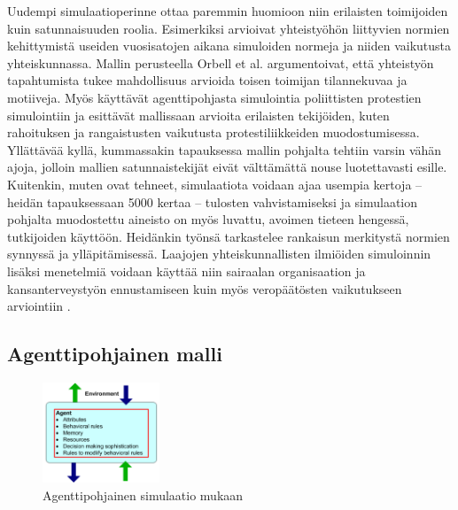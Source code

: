 \documentclass[finnish,gradu,twoside,12pt]{tktltiki}
\begin{document}
Uudempi simulaatioperinne ottaa paremmin huomioon niin erilaisten toimijoiden kuin satunnaisuuden roolia. Esimerkiksi \citet{orbell2004machiavellian} arvioivat yhteistyöhön liittyvien normien kehittymistä useiden vuosisatojen aikana simuloiden normeja ja niiden vaikutusta yhteiskunnassa. Mallin perusteella Orbell et al. argumentoivat, että yhteistyön tapahtumista tukee mahdollisuus arvioida toisen toimijan tilannekuvaa ja motiiveja. Myös \citet{altaweel2012mobilizing} käyttävät agenttipohjasta simulointia poliittisten protestien simulointiin ja esittävät mallissaan arvioita erilaisten tekijöiden, kuten rahoituksen ja rangaistusten vaikutusta protestiliikkeiden muodostumisessa. Yllättävää kyllä, kummassakin tapauksessa mallin pohjalta tehtiin varsin vähän ajoja, jolloin mallien satunnaistekijät eivät välttämättä nouse luotettavasti esille. Kuitenkin, muten \citet{Villatoro2013} ovat tehneet, simulaatiota voidaan ajaa usempia kertoja -- heidän tapauksessaan 5000 kertaa -- tulosten vahvistamiseksi ja simulaation pohjalta muodostettu aineisto on myös luvattu, avoimen tieteen hengessä, tutkijoiden käyttöön. Heidänkin työnsä tarkastelee rankaisun merkitystä normien synnyssä ja ylläpitämisessä. Laajojen yhteiskunnallisten ilmiöiden simuloinnin lisäksi menetelmiä voidaan käyttää niin sairaalan organisaation ja kansanterveystyön ennustamiseen \citep{Pearson2011} kuin myös veropäätösten vaikutukseen arviointiin \citep{bloomquist2006comparison}.

 
\subsection{Agenttipohjainen malli}

\begin{figure}
\includegraphics[height=3cm]{images/agenttimalli.png} 
\caption{Agenttipohjainen simulaatio \citet{Macal2009} mukaan}
\end{figure}
\end{document}
